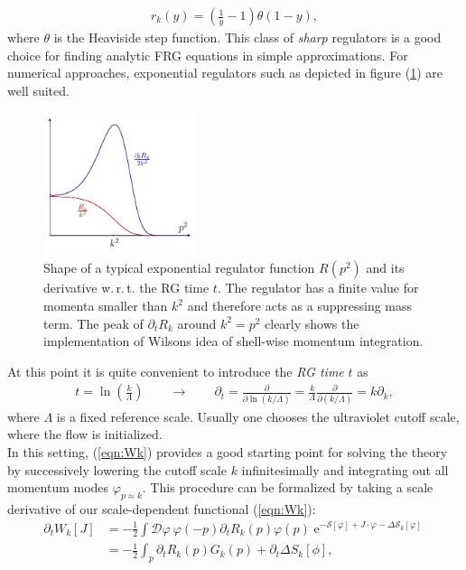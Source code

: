 \begin{align}
r_k(y) = \left(\frac{1}{y} - 1\right)\theta(1-y),
\label{eqn:Litim}	
\end{align}
where $\theta$ is the Heaviside step function. This class of \textit{sharp} regulators is a good choice for finding analytic FRG equations in simple approximations. For numerical approaches, exponential regulators such as depicted in figure (\ref{fig:exp_regulator}) are well suited.\\
\begin{figure}[t]
\centering
\includegraphics[width=0.4\textwidth]{figs/Plots/regulator_plot}
\caption[Shape of a typical exponential regulator function $R(p^2)$ and its derivative w.\,r.\,t. the RG time $t$.]{Shape of a typical exponential regulator function $R(p^2)$ and its derivative w.\,r.\,t. the RG time $t$. The regulator has a finite value for momenta smaller than $k^2$ and therefore acts as a suppressing mass term. The peak of $\partial_tR_k$ around $k^2=p^2$ clearly shows the implementation of Wilsons idea of shell-wise momentum integration.}	
\label{fig:exp_regulator}
\hrulefill
\end{figure}
At this point it is quite convenient to introduce the \textit{RG time} $t$ as
\begin{align}
	t = \ln\left(\frac{k}{\Lambda}\right) \qquad \longrightarrow\qquad \partial_t = \frac{\partial}{\partial\ln(k/\Lambda)} = \frac{k}{\Lambda}\frac{\partial}{\partial(k/\Lambda)} = k \partial_k,
\end{align}
where $\Lambda$ is a fixed reference scale. Usually one chooses the ultraviolet cutoff scale, where the flow is initialized.\\
In this setting, (\ref{eqn:Wk}) provides a good starting point for solving the theory by successively lowering the cutoff scale $k$ infinitesimally and integrating out all momentum modes $\varphi_{p\approx k}$. This procedure can be formalized by taking a scale derivative of our scale-dependent functional (\ref{eqn:Wk}):
\begin{equation}
\begin{aligned} \partial_{t} W_{k}[J] &=-\frac{1}{2} \int \mathcal{D} \varphi \ \varphi(-p) \partial_{t} R_{k}(p) \varphi(p) \operatorname{e}^{-\mathcal{S}[\varphi]+ J \cdot\varphi - \Delta \mathcal{S}_{k}[\varphi]} \\ &=-\frac{1}{2} \int_p \partial_{t} R_{k}(p) G_{k}(p)+\partial_{t} \Delta S_{k}[\phi], 
\label{eqn:dtW}
\end{aligned}
\end{equation}
